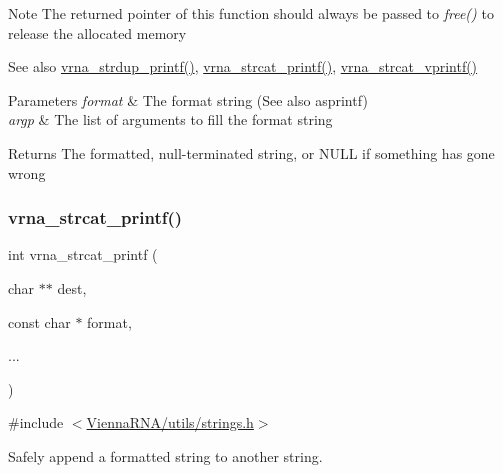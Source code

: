 \begin{DoxyNote}{Note}
The returned pointer of this function should always be passed to {\itshape free()} to release the allocated memory
\end{DoxyNote}
\begin{DoxySeeAlso}{See also}
\mbox{\hyperlink{group__string__utils_ga33cc0190a326ec368277caa777b8bf18}{vrna\+\_\+strdup\+\_\+printf()}}, \mbox{\hyperlink{group__string__utils_gac0771ec71316023067f2aae61a5aa0fb}{vrna\+\_\+strcat\+\_\+printf()}}, \mbox{\hyperlink{group__string__utils_ga122df216996ba62fd5056b7743e3131a}{vrna\+\_\+strcat\+\_\+vprintf()}}
\end{DoxySeeAlso}

\begin{DoxyParams}{Parameters}
{\em format} & The format string (See also asprintf) \\
\hline
{\em argp} & The list of arguments to fill the format string \\
\hline
\end{DoxyParams}
\begin{DoxyReturn}{Returns}
The formatted, null-\/terminated string, or N\+U\+LL if something has gone wrong 
\end{DoxyReturn}
\mbox{\label{group__string__utils_gac0771ec71316023067f2aae61a5aa0fb}} 
\subsubsection{\texorpdfstring{vrna\_strcat\_printf()}{vrna\_strcat\_printf()}}
{\footnotesize\ttfamily int vrna\+\_\+strcat\+\_\+printf (\begin{DoxyParamCaption}\item[{char $\ast$$\ast$}]{dest,  }\item[{const char $\ast$}]{format,  }\item[{}]{... }\end{DoxyParamCaption})}



{\ttfamily \#include $<$\mbox{\hyperlink{strings_8h}{Vienna\+R\+N\+A/utils/strings.\+h}}$>$}



Safely append a formatted string to another string. 

